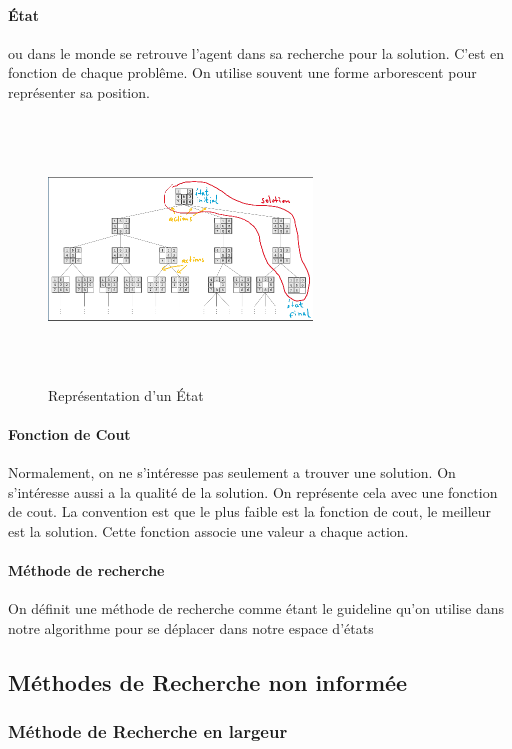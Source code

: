 \documentclass[oneside]{book}
\begin{document}
\paragraph{État}
ou dans le monde se retrouve l'agent dans sa recherche pour la solution. C'est en fonction de chaque problême. On utilise souvent une forme arborescent pour représenter sa position.
\begin{figure}[!ht]
\centering
\includegraphics[width = 7cm, height = 7cm, keepaspectratio]{Etat.png}
\caption{Représentation d'un État}
\label{fig:etat}
\end{figure}

\paragraph{Fonction de Cout}
Normalement, on ne s'intéresse pas seulement a trouver une solution. On s'intéresse aussi a la qualité de la solution. On représente cela avec une fonction de cout. La convention est que le plus faible est la fonction de cout, le meilleur est la solution. Cette fonction associe une valeur a chaque action.

\paragraph{Méthode de recherche}
On définit une méthode de recherche comme étant le guideline qu'on utilise dans notre algorithme pour se déplacer dans notre espace d'états


\subsection{Méthodes de Recherche non informée}

\subsubsection{Méthode de Recherche en largeur}
\end{document}
